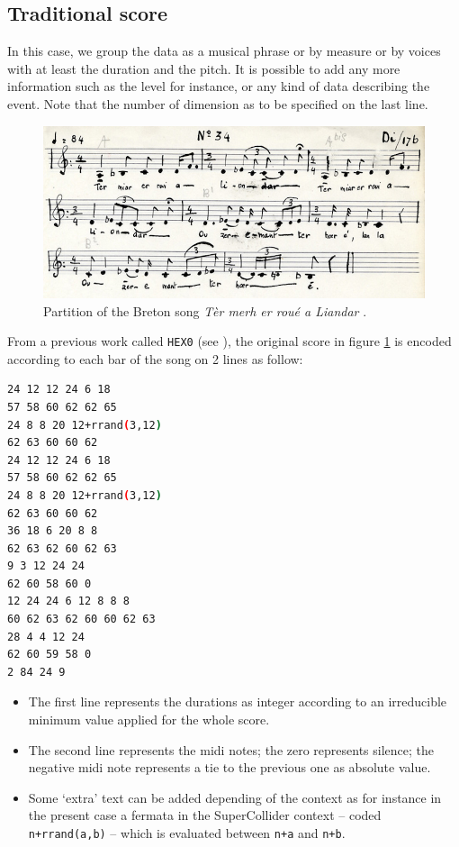 \subsection{Traditional score}
\label{tradscore}

In this case, we group the data as a musical phrase or by measure or by voices with at least the duration and the pitch. It is possible to add any more information such as the level for instance, or any kind of data describing the event. Note that the number of dimension as to be specified on the last line.

\begin{figure}[!hbt]
	\begin{center}
		\includegraphics[scale=0.4]{img/2334}
		\caption{Partition of the Breton song \textit{T\`er merh er rou\'e a Liandar} \citep{mbb}.}
		\label{fig:ch34}
	\end{center}
\end{figure}

From a previous work called \texttt{HEX0} (see ), the original score in figure \ref{fig:ch34} is encoded according to each bar of the song on 2 lines as follow:

\begin{lstlisting}[language=bash]
24 12 12 24 6 18
57 58 60 62 62 65
24 8 8 20 12+rrand(3,12)
62 63 60 60 62
24 12 12 24 6 18
57 58 60 62 62 65
24 8 8 20 12+rrand(3,12)
62 63 60 60 62
36 18 6 20 8 8
62 63 62 60 62 63
9 3 12 24 24
62 60 58 60 0
12 24 24 6 12 8 8 8
60 62 63 62 60 60 62 63
28 4 4 12 24
62 60 59 58 0
2 84 24 9
\end{lstlisting}

\begin{itemize}
\item The first line represents the durations as integer according to an irreducible minimum value applied for the whole score.
\item The second line represents the midi notes; the zero represents silence; the negative midi note represents a tie to the previous one as absolute value.
\item Some `extra' text can be added depending of the context as for instance in the present case a fermata in the SuperCollider context --  coded \texttt{n+rrand(a,b)} -- which is evaluated between \texttt{n+a} and \texttt{n+b}.
\end{itemize}


